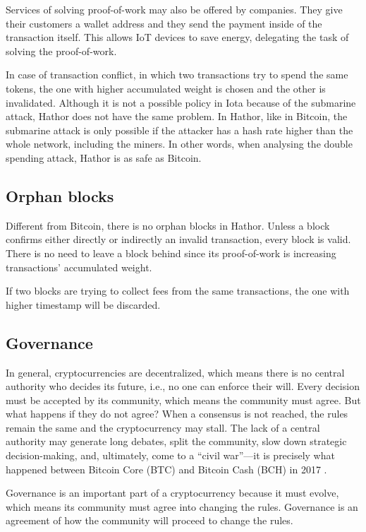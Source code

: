 Services of solving proof-of-work may also be offered by companies. They give their customers a wallet address and they send the payment inside of the transaction itself. This allows IoT devices to save energy, delegating the task of solving the proof-of-work.

In case of transaction conflict, in which two transactions try to spend the same tokens, the one with higher accumulated weight is chosen and the other is invalidated. Although it is not a possible policy in Iota because of the submarine attack, Hathor does not have the same problem. In Hathor, like in Bitcoin, the submarine attack is only possible if the attacker has a hash rate higher than the whole network, including the miners. In other words, when analysing the double spending attack, Hathor is as safe as Bitcoin.


\subsection{Orphan blocks}

Different from Bitcoin, there is no orphan blocks in Hathor. Unless a block confirms either directly or indirectly an invalid transaction, every block is valid. There is no need to leave a block behind since its proof-of-work is increasing transactions' accumulated weight.

If two blocks are trying to collect fees from the same transactions, the one with higher timestamp will be discarded.


\subsection{Governance}

In general, cryptocurrencies are decentralized, which means there is no central authority who decides its future, i.e., no one can enforce their will. Every decision must be accepted by its community, which means the community must agree. But what happens if they do not agree? When a consensus is not reached, the rules remain the same and the cryptocurrency may stall. The lack of a central authority may generate long debates, split the community, slow down strategic decision-making, and, ultimately, come to a ``civil war''---it is precisely what happened between Bitcoin Core (BTC) and Bitcoin Cash (BCH) in 2017 \citep{bloomberg2017civilwar, forbes2017civilwar}.

Governance is an important part of a cryptocurrency because it must evolve, which means its community must agree into changing the rules. Governance is an agreement of how the community will proceed to change the rules.

